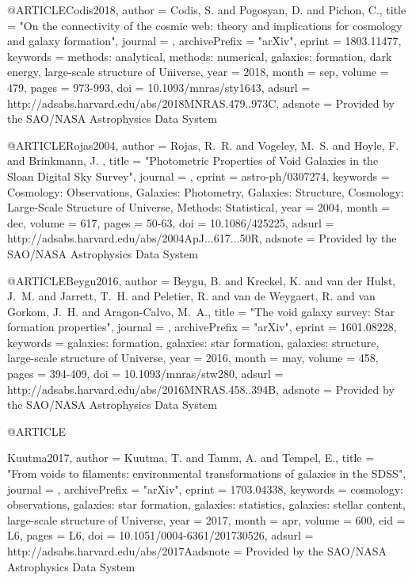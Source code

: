 \documentclass{aa}
\begin{document}
{{{{{{{{{{{{{@ARTICLE{Codis2018,
   author = {{Codis}, S. and {Pogosyan}, D. and {Pichon}, C.},
    title = "{On the connectivity of the cosmic web: theory and implications for cosmology and galaxy formation}",
  journal = {\mnras},
archivePrefix = "arXiv",
   eprint = {1803.11477},
 keywords = {methods: analytical, methods: numerical, galaxies: formation, dark energy, large-scale structure of Universe},
     year = 2018,
    month = sep,
   volume = 479,
    pages = {973-993},
      doi = {10.1093/mnras/sty1643},
   adsurl = {http://adsabs.harvard.edu/abs/2018MNRAS.479..973C},
  adsnote = {Provided by the SAO/NASA Astrophysics Data System}
}

@ARTICLE{Rojas2004,
   author = {{Rojas}, R.~R. and {Vogeley}, M.~S. and {Hoyle}, F. and {Brinkmann}, J.
	},
    title = "{Photometric Properties of Void Galaxies in the Sloan Digital Sky Survey}",
  journal = {\apj},
   eprint = {astro-ph/0307274},
 keywords = {Cosmology: Observations, Galaxies: Photometry, Galaxies: Structure, Cosmology: Large-Scale Structure of Universe, Methods: Statistical},
     year = 2004,
    month = dec,
   volume = 617,
    pages = {50-63},
      doi = {10.1086/425225},
   adsurl = {http://adsabs.harvard.edu/abs/2004ApJ...617...50R},
  adsnote = {Provided by the SAO/NASA Astrophysics Data System}
}

@ARTICLE{Beygu2016,
   author = {{Beygu}, B. and {Kreckel}, K. and {van der Hulst}, J.~M. and 
	{Jarrett}, T.~H. and {Peletier}, R. and {van de Weygaert}, R. and 
	{van Gorkom}, J.~H. and {Aragon-Calvo}, M.~A.},
    title = "{The void galaxy survey: Star formation properties}",
  journal = {\mnras},
archivePrefix = "arXiv",
   eprint = {1601.08228},
 keywords = {galaxies: formation, galaxies: star formation, galaxies: structure, large-scale structure of Universe},
     year = 2016,
    month = may,
   volume = 458,
    pages = {394-409},
      doi = {10.1093/mnras/stw280},
   adsurl = {http://adsabs.harvard.edu/abs/2016MNRAS.458..394B},
  adsnote = {Provided by the SAO/NASA Astrophysics Data System}
}

@ARTICLE{Kuutma2017,
   author = {{Kuutma}, T. and {Tamm}, A. and {Tempel}, E.},
    title = "{From voids to filaments: environmental transformations of galaxies in the SDSS}",
  journal = {\aap},
archivePrefix = "arXiv",
   eprint = {1703.04338},
 keywords = {cosmology: observations, galaxies: star formation, galaxies: statistics, galaxies: stellar content, large-scale structure of Universe},
     year = 2017,
    month = apr,
   volume = 600,
      eid = {L6},
    pages = {L6},
      doi = {10.1051/0004-6361/201730526},
   adsurl = {http://adsabs.harvard.edu/abs/2017Aadsnote = {Provided by the SAO/NASA Astrophysics Data System}
}

}}}}}}}}}}}}}}
\end{document}
